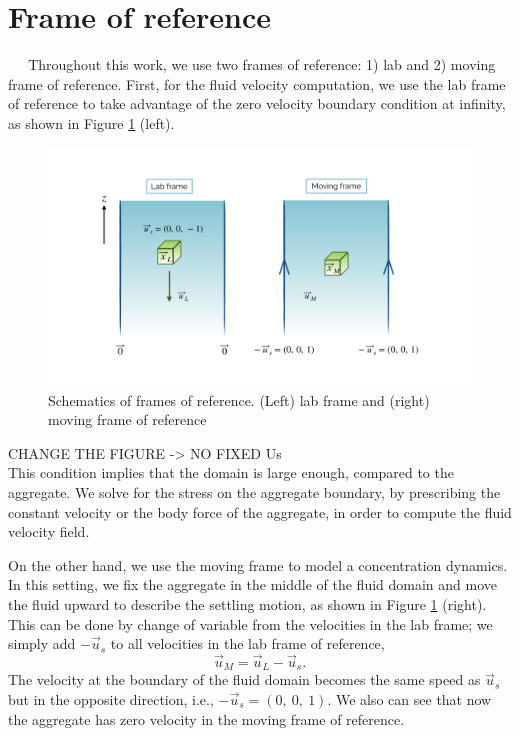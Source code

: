 \section{Frame of reference}
$\ \ \ \ \ $ 
Throughout this work, we use two frames of reference: 1) lab and 2) moving frame of reference. First, for the fluid velocity computation, we use the lab frame of reference to take advantage of the zero velocity boundary condition at infinity, as shown in Figure \ref{fig_frame_ref} (left). 
\begin{figure}[h]
	\begin{center}
		\includegraphics[scale=0.25]{figures/fig_frame_ref}
	\end{center}
	\caption{Schematics of frames of reference. (Left) lab frame and (right) moving frame of reference }
	\label{fig_frame_ref}
\end{figure}
{\color{blue} CHANGE THE FIGURE -> NO FIXED Us}
\\
This condition implies that the domain is large enough, compared to the aggregate.
We solve for the stress on the aggregate boundary, by prescribing the constant velocity or the body force of the aggregate, in order to compute the fluid velocity field. 
\par
On the other hand, we use the moving frame to model a concentration dynamics.
In this setting, we fix the aggregate in the middle of the fluid domain and move the fluid upward to describe the settling motion, as shown in Figure \ref{fig_frame_ref} (right).
This can be done by change of variable from the velocities in the lab frame; we simply add $-\vec{u}_s$ to all velocities in the lab frame of reference,
\[
\vec{u}_M = \vec{u}_L - \vec{u}_s.
\]
 The velocity at the boundary of the fluid domain becomes the same speed as $\vec{u}_s$ but in the opposite direction, i.e., $-\vec{u}_s = (0, \ 0, \ 1)$. We also can see that now the aggregate has zero velocity in the moving frame of reference.

 